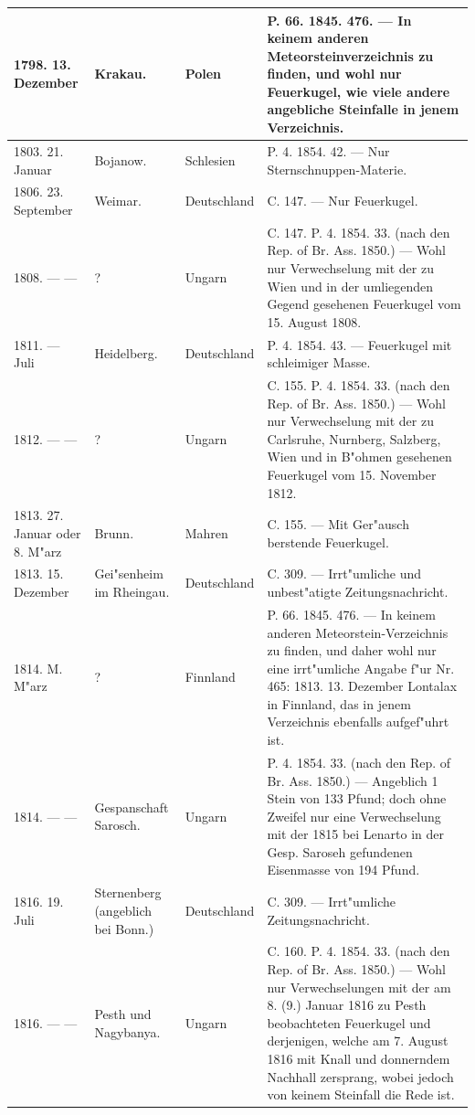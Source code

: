 \documentclass[a4paper, 8pt, oneside, polutonikogreek, german]{article}
\begin{document}
\begin{center}
\begin{longtable}{| p{20mm} | p{25mm} | p{20mm} | p{55mm} |}
        1798. 13. Dezember & Krakau. & Polen & P. 66. 1845. 476. --- In keinem anderen Meteorsteinverzeichnis zu finden, und wohl nur Feuerkugel, wie viele andere angebliche Steinfalle in jenem Verzeichnis. \\ \hline
        1803. 21. Januar & Bojanow. & Schlesien & P. 4. 1854. 42. --- Nur Sternschnuppen-Materie. \\ \hline
        1806. 23. September & Weimar. & Deutschland & C. 147. --- Nur Feuerkugel. \\ \hline
        1808. --- --- & ? & Ungarn & C. 147. P. 4. 1854. 33. (nach den Rep. of Br. Ass. 1850.) --- Wohl nur Verwechselung mit der zu Wien und in der umliegenden Gegend gesehenen Feuerkugel vom 15. August 1808. \\ \hline
        1811. --- Juli & Heidelberg. & Deutschland & P. 4. 1854. 43. --- Feuerkugel mit schleimiger Masse. \\ \hline
        1812. --- --- & ? & Ungarn & C. 155. P. 4. 1854. 33. (nach den Rep. of Br. Ass. 1850.) --- Wohl nur Verwechselung mit der zu Carlsruhe, Nurnberg, Salzberg, Wien und in B"ohmen gesehenen Feuerkugel vom 15. November 1812. \\ \hline
        1813. 27. Januar oder 8. M"arz & Brunn. & Mahren & C. 155. --- Mit Ger"ausch berstende Feuerkugel. \\ \hline
        1813. 15. Dezember & Gei"senheim im Rheingau. & Deutschland & C. 309. --- Irrt"umliche und unbest"atigte Zeitungsnachricht. \\ \hline
        1814. M. M"arz & ? & Finnland & P. 66. 1845. 476. --- In keinem anderen Meteorstein-Verzeichnis zu finden, und daher wohl nur eine irrt"umliche Angabe f"ur Nr. 465: 1813. 13. Dezember Lontalax in Finnland, das in jenem Verzeichnis ebenfalls aufgef"uhrt ist. \\ \hline
        1814. --- --- & Gespanschaft Sarosch. & Ungarn & P. 4. 1854. 33. (nach den Rep. of Br. Ass. 1850.) --- Angeblich 1 Stein von 133 Pfund; doch ohne Zweifel nur eine Verwechselung mit der 1815 bei Lenarto in der Gesp. Saroseh gefundenen Eisenmasse von 194 Pfund. \\ \hline
        1816. 19. Juli & Sternenberg (angeblich bei Bonn.) & Deutschland & C. 309. --- Irrt"umliche Zeitungsnachricht. \\ \hline
        1816. --- --- & Pesth und Nagybanya. & Ungarn & C. 160. P. 4. 1854. 33. (nach den Rep. of Br. Ass. 1850.) --- Wohl nur Verwechselungen mit der am 8. (9.) Januar 1816 zu Pesth beobachteten Feuerkugel und derjenigen, welche am 7. August 1816 mit Knall und donnerndem Nachhall zersprang, wobei jedoch von keinem Steinfall die Rede ist. \\ \hline

\end{longtable}
\end{center}
\end{document}
